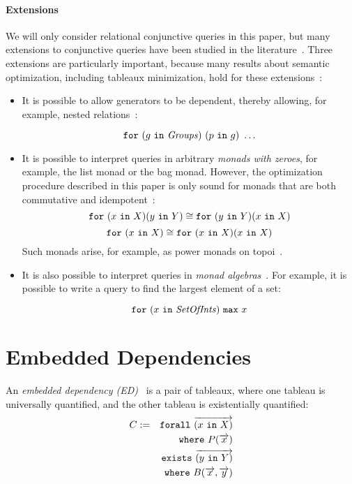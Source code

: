 \documentclass{sigplanconf}
\newcommand{\FOR}{{\tt for}\relax\ifmmode\ \else\xspace\fi}
\newcommand{\FORALL}{{\tt forall}\relax\ifmmode\ \else\xspace\fi}
\newcommand{\EXISTS}{{\tt exists}\relax\ifmmode\ \else\xspace\fi}
\newcommand{\WHERE}{{\tt where}\relax\ifmmode\ \else\xspace\fi}
\newcommand{\IN}{ \ {\tt in} \ }
\newcommand{\relation}[1]{\ensuremath{\mathit{#1}}\xspace}
\begin{document}
\paragraph{Extensions}
We will only consider relational conjunctive queries in this paper, but many extensions to conjunctive queries have been studied in the literature~\cite{foundations}.  Three extensions are particularly important, because many results about semantic optimization, including tableaux minimization, hold for these extensions~\cite{Popa99anequational}:
\begin{itemize} 
\item  It is possible to allow generators to be dependent, thereby allowing, for example, nested relations~\cite{Popa99anequational}:
\begin{normalsize}
$$ \FOR (g \IN \relation{Groups}) \ (p \IN g) \ \ldots $$
\end{normalsize}
\item It is possible to interpret queries in arbitrary {\it monads with zeroes}, for example, the list monad or the bag monad.  However, the  optimization procedure described in this paper is only sound for monads that are both commutative and idempotent~\cite{Popa99anequational}:
$$
\FOR (x \IN X)(y \IN Y)  \cong \FOR (y \IN Y) (x \IN X) 
$$
$$
\FOR (x \IN X) \cong \FOR (x \IN X)(x \IN X) 
$$
Such monads arise, for example, as power monads on topoi~\cite{BW}.
\item It is also possible to interpret queries in {\it monad algebras}~\cite{755736}.  For example, it is possible to write a query to find the largest element of a set: 
\begin{normalsize}
$$ \FOR (x \IN \relation{SetOfInts}) \ {\tt max} \ x $$
\end{normalsize}

\end{itemize}

\section{Embedded Dependencies}
\label{sec:eds}

An {\it embedded dependency (ED)}~\cite{foundations} is a pair of tableaux, where one tableau is universally quantified, and the other tableau is existentially quantified:
\begin{eqnarray*}
C & := & \FORALL \overrightarrow{(x \IN X)} \\
 & & \WHERE P(\overrightarrow{x}) \\
 & & \EXISTS \overrightarrow{(y \IN Y)} \\
 & & \WHERE B(\overrightarrow{x}, \overrightarrow{y})
\end{eqnarray*}
\end{document}
